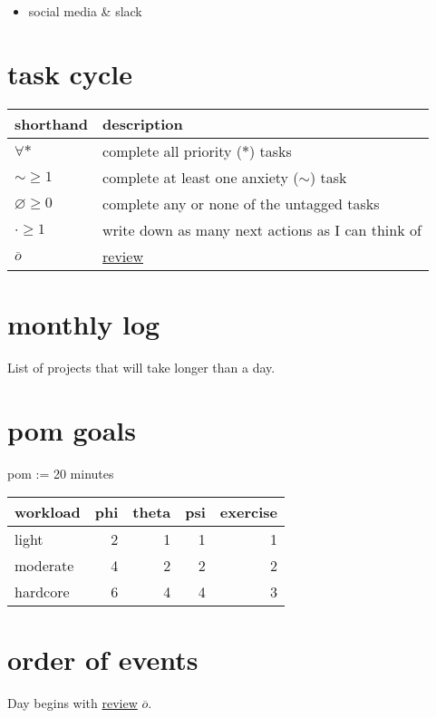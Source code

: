 \documentclass[]{book}
\providecommand{\tightlist}{%
  \setlength{\itemsep}{0pt}\setlength{\parskip}{0pt}}
\begin{document}
\begin{itemize}
\tightlist
\item
  social media \& slack
\end{itemize}

\hypertarget{task-cycle}{%
\section{task cycle}\label{task-cycle}}

\begin{longtable}[]{@{}ll@{}}
\toprule
shorthand & description\tabularnewline
\midrule
\endhead
\(\forall *\) & complete all priority (\(*\)) tasks\tabularnewline
\(\sim \geqslant 1\) & complete at least one anxiety (\(\sim\)) task\tabularnewline
\(\varnothing \geqslant 0\) & complete any or none of the untagged tasks\tabularnewline
\(\cdot \geqslant 1\) & write down as many next actions as I can think of\tabularnewline
\(\overline o\) & \protect\hyperlink{review}{review}\tabularnewline
\bottomrule
\end{longtable}

\hypertarget{monthly-log}{%
\section{monthly log}\label{monthly-log}}

List of projects that will take longer than a day.

\hypertarget{pom-goals}{%
\section{pom goals}\label{pom-goals}}

pom := 20 minutes

\begin{tabular}{l|r|r|r|r}
\hline
workload & phi & theta & psi & exercise\\
\hline
light & 2 & 1 & 1 & 1\\
\hline
moderate & 4 & 2 & 2 & 2\\
\hline
hardcore & 6 & 4 & 4 & 3\\
\hline
\end{tabular}

\hypertarget{order-of-events}{%
\section{order of events}\label{order-of-events}}

Day begins with \protect\hyperlink{review}{review} \(\overline o\).
\end{document}
